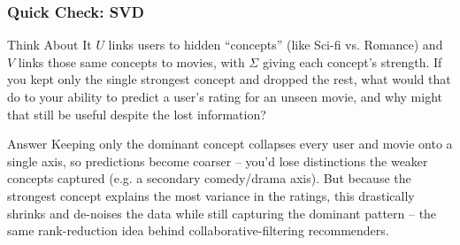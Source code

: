\begin{frame}[fragile]\frametitle{Quick Check: SVD}
\begin{block}{Think About It}
$U$ links users to hidden ``concepts'' (like Sci-fi vs. Romance) and $V$ links those same
concepts to movies, with $\Sigma$ giving each concept's strength. If you kept only the single
strongest concept and dropped the rest, what would that do to your ability to predict a
user's rating for an unseen movie, and why might that still be useful despite the lost
information?
\end{block}
\pause
\begin{block}{Answer}
Keeping only the dominant concept collapses every user and movie onto a single axis, so
predictions become coarser -- you'd lose distinctions the weaker concepts captured (e.g. a
secondary comedy/drama axis). But because the strongest concept explains the most variance
in the ratings, this drastically shrinks and de-noises the data while still capturing the
dominant pattern -- the same rank-reduction idea behind collaborative-filtering recommenders.
\end{block}
\end{frame}

